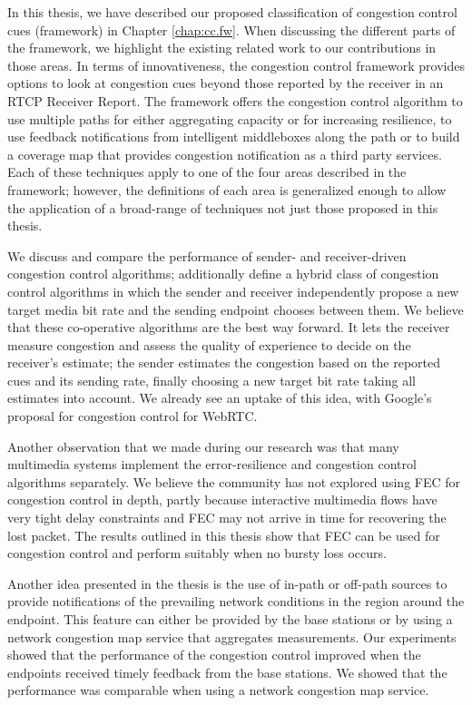 In this thesis, we have described our proposed classification of congestion
control cues (framework) in Chapter \ref{chap:cc.fw}. When discussing the
different parts of the framework, we highlight the existing related work to
our contributions in those areas. In terms of innovativeness, the congestion
control framework provides options to look at congestion cues beyond those
reported by the receiver in an RTCP Receiver Report. The framework offers the
congestion control algorithm to use multiple paths for either aggregating
capacity or for increasing resilience, to use feedback notifications from
intelligent middleboxes along the path or to build a coverage map that
provides congestion notification as a third party services. Each of these
techniques apply to one of the four areas described in the framework; however,
the definitions of each area is generalized enough to allow the application of
a broad-range of techniques not just those proposed in this thesis.


We discuss and compare the performance of sender- and receiver-driven
congestion control algorithms; additionally define a hybrid class of
congestion control algorithms in which the sender and receiver independently
propose a new target media bit rate and the sending endpoint chooses between
them. We believe that these co-operative algorithms are the best way forward.
It lets the receiver measure congestion and assess the quality of experience
to decide on the receiver's estimate; the sender estimates the congestion
based on the reported cues and its sending rate, finally choosing a new target
bit rate taking all estimates into account. We already see an uptake of this
idea, with Google’s proposal for congestion control for WebRTC.

Another observation that we made during our research was that many multimedia
systems implement the error-resilience and congestion control algorithms
separately. We believe the community has not explored using FEC for congestion
control in depth, partly because interactive multimedia flows have very tight
delay constraints and FEC may not arrive in time for recovering the lost
packet. The results outlined in this thesis show that FEC can be used for
congestion control and perform suitably when no bursty loss occurs.

Another idea presented in the thesis is the use of in-path or off-path sources
to provide notifications of the prevailing network conditions in the region
around the endpoint. This feature can either be provided by the base stations
or by using a network congestion map service that aggregates measurements. Our
experiments showed that the performance of the congestion control improved
when the endpoints received timely feedback from the base stations. We showed
that the performance was comparable when using a network congestion map
service.


